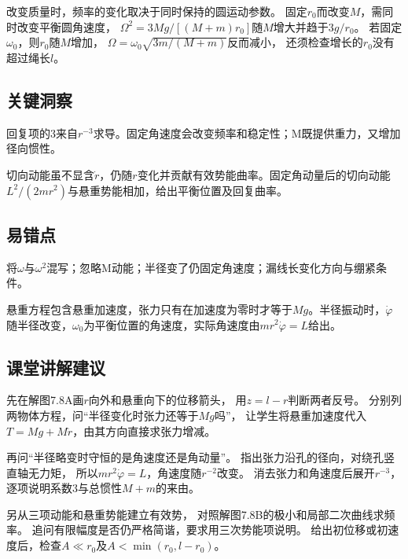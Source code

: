 \documentclass[UTF8,fontset=fandol,a4paper,11pt]{ctexart}
\begin{document}
改变质量时，频率的变化取决于同时保持的圆运动参数。
固定$r_0$而改变$M$，需同时改变平衡圆角速度，
$\Omega^2=3Mg/[(M+m)r_0]$随$M$增大并趋于$3g/r_0$。
若固定$\omega_0$，则$r_0$随$M$增加，
$\Omega=\omega_0\sqrt{3m/(M+m)}$反而减小，
还须检查增长的$r_0$没有超过绳长$l$。




\subsection*{关键洞察}

回复项的3来自\(r^{-3}\)求导。固定角速度会改变频率和稳定性；M既提供重力，又增加径向惯性。

切向动能虽不显含$\dot r$，仍随$r$变化并贡献有效势能曲率。固定角动量后的切向动能$L^2/(2mr^2)$与悬重势能相加，给出平衡位置及回复曲率。




\subsection*{易错点}

将$\omega$与$\omega^2$混写；忽略M动能；半径变了仍固定角速度；漏线长变化方向与绷紧条件。

悬重方程包含悬重加速度，张力只有在加速度为零时才等于$Mg$。半径振动时，$\dot\varphi$随半径改变，$\omega_0$为平衡位置的角速度，实际角速度由$mr^2\dot\varphi=L$给出。




\subsection*{课堂讲解建议}

先在解图7.8A画$r$向外和悬重向下的位移箭头，
用$z=l-r$判断两者反号。
分别列两物体方程，问“半径变化时张力还等于$Mg$吗”，
让学生将悬重加速度代入$T=Mg+M\ddot r$，由其方向直接求张力增减。

再问“半径略变时守恒的是角速度还是角动量”。
指出张力沿孔的径向，对绕孔竖直轴无力矩，
所以$mr^2\dot\varphi=L$，角速度随$r^{-2}$改变。
消去张力和角速度后展开$r^{-3}$，逐项说明系数3与总惯性$M+m$的来由。

另从三项动能和悬重势能建立有效势，
对照解图7.8B的极小和局部二次曲线求频率。
追问有限幅度是否仍严格简谐，要求用三次势能项说明。
给出初位移或初速度后，检查$A\ll r_0$及$A<\min(r_0,l-r_0)$。
\end{document}
